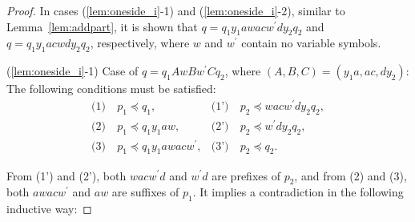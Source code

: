 \begin{proof}
\smallskip

In cases (\ref{lem:oneside_i}-1) and (\ref{lem:oneside_i}-2), similar to Lemma~\ref{lem:addpart}, it is shown that $q=q_{1}y_{1}awacw^{\prime}dy_{2}q_{2}$ and $q=q_{1}y_{1}acwdy_{2}q_{2}$, respectively, where $w$ and $w^{\prime}$ contain no variable symbols.

\smallskip

\noindent
(\ref{lem:oneside_i}-1) Case of $q=q_{1}AwBw^{\prime}Cq_{2}$, where {\color{black}$( A,B,C ) = ( y_{1}a,ac,dy_{2} )$}:
The following conditions must be satisfied:
\begin{align*}
  \textrm{(1)}~& p_{1} \preceq q_{1}, & \textrm{(1')}~& p_{2} \preceq wacw^{\prime}dy_{2}q_{2}, \\
  \textrm{(2)}~& p_{1} \preceq q_{1}y_{1}aw, & \textrm{(2')}~& p_{2} \preceq w^{\prime}dy_{2}q_{2}, \\
  \textrm{(3)}~& p_{1} \preceq q_{1}y_{1}awacw^{\prime}, & \textrm{(3')}~& p_{2} \preceq q_{2}.
\end{align*}

From (1') and (2'), {\color{black}both }$wacw^{\prime}d$ and $w^{\prime}d$ are prefixes of $p_{2}$, and from (2) and (3), {\color{black}both }$awacw^{\prime}$ and $aw$ are suffixes of $p_{1}$.
It implies a contradiction in the following inductive way:


\end{proof}
